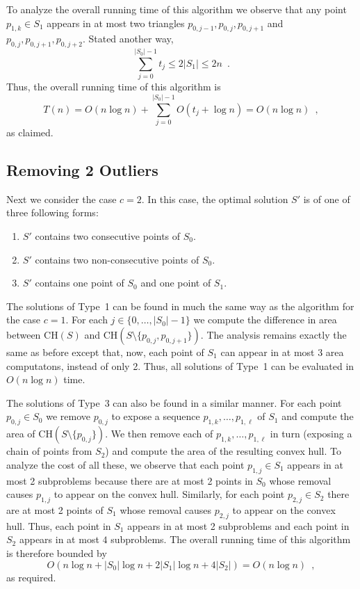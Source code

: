 \documentclass[lotsofwhite]{patmorin}
\newcommand{\ch}{\mathrm{CH}}
\begin{document}
To analyze the overall running time of this algorithm we observe that
any point $p_{1,k}\in S_1$ appears in at most two triangles
$p_{0,j-1},p_{0,j},p_{0,j+1}$ and
$p_{0,j},p_{0,j+1},p_{0,j+2}$.  Stated another way,
\[
     \sum_{j=0}^{|S_0|-1} t_j \le 2|S_1|\le 2n \enspace .
\]
Thus, the overall running time of this algorithm is
\[
     T(n) = O(n\log n)+\sum_{j=0}^{|S_0|-1} O(t_j+\log n) = O(n\log n) \enspace ,
\]
as claimed.

\subsection{Removing 2 Outliers}

Next we consider the case $c=2$.  In this case, the optimal solution
$S'$ is of one of three following forms:

\begin{enumerate}
\item $S'$ contains two consecutive points of $S_0$.
\item $S'$ contains two non-consecutive points of $S_0$.
\item $S'$ contains one point of $S_0$ and one point of $S_1$.
\end{enumerate}

The solutions of Type~1 can be found in much the same way as the
algorithm for the case $c=1$.  For each $j\in\{0,\ldots,|S_0|-1\}$ we
compute the difference in area between $\ch(S)$ and
$\ch(S\setminus\{p_{0,j},p_{0,j+1}\})$.  The analysis remains exactly
the same as before except that, now, each point of $S_1$ can appear in
at most $3$ area computatons, instead of only 2.  Thus, all solutions
of Type~1 can be evaluated in $O(n\log n)$ time.

The solutions of Type~3 can also be found in a similar manner.  For
each point $p_{0,j}\in S_0$ we remove $p_{0,j}$ to expose a sequence
$p_{1,k},\ldots,p_{1,\ell}$ of $S_1$ and compute the area of
$\ch(S\setminus\{p_{0,j}\})$.  We then remove each of
$p_{1,k},\ldots,p_{1,\ell}$ in turn (exposing a chain of points from
$S_2$) and compute the area of the resulting convex hull.  To analyze
the cost of all these, we observe that each point $p_{1,j}\in S_1$
appears in at most 2 subproblems because there are at most 2 points in
$S_0$ whose removal causes $p_{1,j}$ to appear on the convex hull.
Similarly, for each point $p_{2,j}\in S_2$ there are at most 2 points
of $S_1$ whose removal causes $p_{2,j}$ to appear on the convex hull.
Thus, each point in $S_1$ appears in at most 2 subproblems and each
point in $S_2$ appears in at most $4$ subproblems.  The overall
running time of this algorithm is therefore bounded by
\[
    O\left(n\log n + |S_0|\log n + 2|S_1|\log n + 4|S_2|\right) = O(n\log n) \enspace ,
\]
as required.
\end{document}
